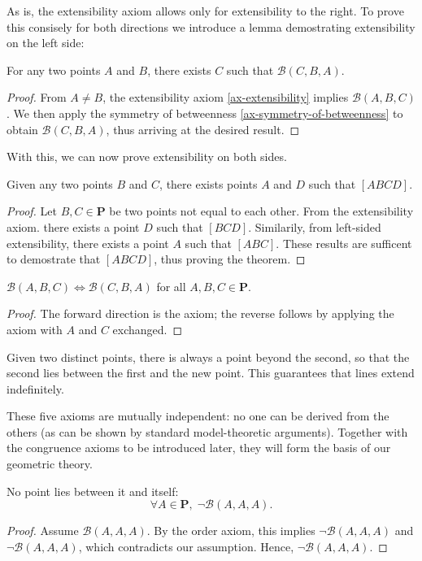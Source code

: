 \documentclass[../../../main/main.tex]{subfiles}
\begin{document}
As is, the extensibility axiom allows only for extensibility to the right. To prove this consisely for both directions we introduce a lemma demostrating extensibility on the left side:
\begin{theorem}\label{thm:left-sided-extensibility}
    For any two points $A$ and $B$, there exists $C$ such that $\mathcal{B}(C,B,A)$.
\end{theorem}
\begin{proof}
    From $A \neq B$, the extensibility axiom \ref{ax-extensibility} implies $\mathcal{B}(A,B,C)$. We then apply the symmetry of betweenness \ref{ax-symmetry-of-betweenness} to obtain $\mathcal{B}(C,B,A)$, thus arriving at the desired result.
\end{proof}
With this, we can now prove extensibility on both sides.
\begin{theorem}
    Given any two points $B$ and $C$, there exists points $A$ and $D$ such that $[ABCD]$.
\end{theorem}
\begin{proof}
    Let $B, C \in \mathbf{P}$ be two points not equal to each other. From the extensibility axiom. there exists a point $D$ such that $[BCD]$. Similarily, from left-sided extensibility, there exists a point $A$ such that $[ABC]$. These results are sufficent to demostrate that $[ABCD]$, thus proving the theorem.
\end{proof}

\begin{theorem}
$\mathcal{B}(A,B,C) \iff \mathcal{B}(C,B,A)$ for all $A,B,C\in\mathbf{P}$.
\end{theorem}
\begin{proof}
The forward direction is the axiom; the reverse follows by applying
the axiom with $A$ and $C$ exchanged.
\end{proof}

Given two distinct points, there is always a point beyond the second,
so that the second lies between the first and the new point.  This
guarantees that lines extend indefinitely.

These five axioms are mutually independent: no one can be derived from
the others (as can be shown by standard model-theoretic arguments).
Together with the congruence axioms to be introduced later, they will
form the basis of our geometric theory.

\begin{theorem}
    No point lies between it and itself:
    \[
    \forall A \in \mathbf{P},\; \neg \mathcal{B}(A,A,A).
    \]
\end{theorem}
\begin{proof}
    Assume $\mathcal{B}(A,A,A)$. By the order axiom, this implies $\neg \mathcal{B}(A,A,A)$ and $\neg \mathcal{B}(A,A,A)$, which contradicts our assumption. Hence, $\neg \mathcal{B}(A,A,A)$.
\end{proof}
\end{document}
